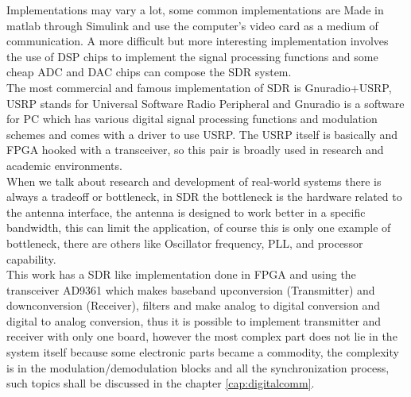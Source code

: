Implementations may vary a lot, some common implementations are Made in matlab
through Simulink and use the computer’s video card as a medium of communication.
A more difficult but more interesting implementation involves the use of DSP chips
to implement the signal processing functions and some cheap ADC and DAC chips can
compose the SDR system.\\

The most commercial and famous implementation of SDR is Gnuradio+USRP, USRP
stands for Universal Software Radio Peripheral \cite{web:usrp} and Gnuradio \cite{web:gnuradio}
is a software for PC which has various digital signal processing functions and
modulation schemes and comes with a driver to use USRP. The USRP itself is
basically and FPGA hooked with a transceiver, so this pair is broadly used in
research and academic environments.\\

When we talk about research and development of real-world systems there is always
a tradeoff or bottleneck, in SDR the bottleneck is the hardware related to the
antenna interface, the antenna is designed to work better in a specific bandwidth,
this can limit the application, of course this is only one example of bottleneck,
there are others like Oscillator frequency, PLL, and processor capability.\\


This work has a SDR like implementation done in FPGA and using the transceiver
AD9361 which makes baseband upconversion (Transmitter) and downconversion (Receiver),
filters and make analog to digital conversion and digital to analog conversion,
thus it is possible to implement transmitter and receiver with only one board,
however the most complex part does not lie in the system itself because some electronic
parts became a commodity, the complexity is in the modulation/demodulation blocks
and all the synchronization process, such topics shall be discussed in the chapter \ref{cap:digitalcomm}.
